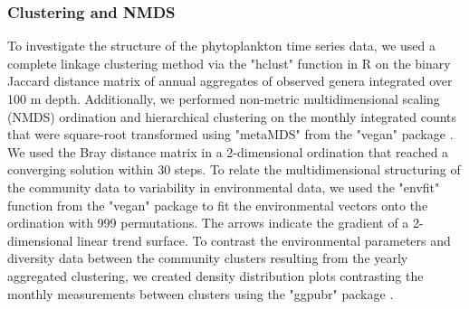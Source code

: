 \documentclass[draft]{agujournal2019}
\begin{document}
    \subsubsection{Clustering and NMDS}
    To investigate the structure of the phytoplankton time series data, we used a complete linkage clustering method via the "hclust" function in R \cite{r_core_team_r_2024} on the binary Jaccard distance matrix of annual aggregates of observed genera integrated over 100 m depth. Additionally, we performed non-metric multidimensional scaling (NMDS) ordination and hierarchical clustering on the monthly integrated counts that were square-root transformed using "metaMDS" from the "vegan" package \cite{oksanen_vegan_2024}. We used the Bray distance matrix in a 2-dimensional ordination that reached a converging solution within 30 steps. To relate the multidimensional structuring of the community data to variability in environmental data, we used the "envfit" function from the "vegan" package to fit the environmental vectors onto the ordination with 999 permutations. The arrows indicate the gradient of a 2-dimensional linear trend surface. 
    To contrast the environmental parameters and diversity data between the community clusters resulting from the yearly aggregated clustering, we created density distribution plots contrasting the monthly measurements between clusters using the "ggpubr" package \cite{kassambara_ggpubr_2023}. %

        
\end{document}
